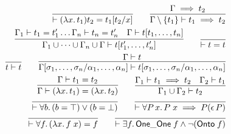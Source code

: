 \documentclass[11pt]{article}
\begin{document}
\thispagestyle{empty}
\begin{align*}
\infer{\vdash(\lambda{x}.\,t_1)t_2=t_1[t_2/x]}{}\qquad
\infer{\Gamma\setminus\{t_1\}\vdash t_1\implies t_2}{\Gamma\implies t_2}\\
\infer{\Gamma_1\cup\dots\cup\Gamma_n\cup\Gamma\vdash t[t_1',\dots,t_n']}{\Gamma_1\vdash t_1=t_1'\dots\Gamma_n\vdash t_n=t_n'&\Gamma\vdash t[t_1,\dots,t_n]}\qquad
\infer{\vdash t = t}{}\\
\infer{t\vdash t}{}\qquad
\infer{\Gamma[\sigma_1,\dots,\sigma_n/\alpha_1,\dots,\alpha_n]\vdash t[\sigma_1,\dots,\sigma_n/\alpha_1,\dots,\alpha_n]}{\Gamma\vdash t}\\
\infer{\Gamma\vdash(\lambda{x}.\,t_1)=(\lambda{x}.\,t_2)}{\Gamma\vdash t_1=t_2}\qquad
\infer{\Gamma_1\cup\Gamma_2\vdash t_2}{\Gamma_1\vdash t_1\implies t_2&\Gamma_2\vdash t_1}\\
\infer{\vdash\forall{b}.\,(b=\top)\lor(b=\bot)}{}\qquad
\infer{\vdash\forall{P}\,x.\,P\;x\implies P(\epsilon\, P)}{}\\
\infer{\vdash\forall{f}.\,(\lambda{x}.\,f\;x)=f}{}\qquad
\infer{\vdash\exists{f}.\,\mathsf{One\_One}\;f\land\lnot(\mathsf{Onto}\;f)}{}
\end{align*}
\end{document}
